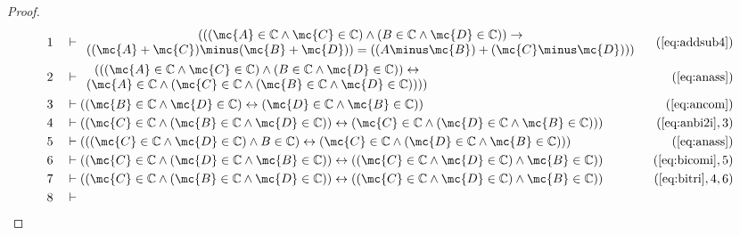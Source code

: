 \begin{proof}
\begin{align}
  1 &&  & \vdash 
     \begin{array}{c}
     ( ( ( \mc{A} \in \mathbb{C} \wedge \mc{C} \in \mathbb{C} ) \wedge ( B
     \in \mathbb{C} \wedge \mc{D} \in \mathbb{C} ) )
     \rightarrow \\
      ( ( \mc{A} + \mc{C} ) \minus ( \mc{B} + \mc{D} ) ) = ( ( A
     \minus \mc{B} ) + ( \mc{C} \minus \mc{D} ) )
     )
     \end{array}
     &(\mbox{\ref{eq:addsub4}})\notag
  \\ 2 &&  & \vdash 
     \begin{array}{c}
     ( ( ( \mc{A} \in \mathbb{C} \wedge \mc{C} \in \mathbb{C} ) \wedge ( B
     \in \mathbb{C} \wedge \mc{D} \in \mathbb{C} ) )
     \leftrightarrow \\
      ( \mc{A} \in \mathbb{C} \wedge ( \mc{C} \in
     \mathbb{C} \wedge ( \mc{B} \in \mathbb{C} \wedge \mc{D} \in
     \mathbb{C} ) ) ) )
     \end{array}
     &(\mbox{\ref{eq:anass}})\notag
  \\ 3 &&  & \vdash ( ( \mc{B} \in \mathbb{C} \wedge \mc{D} \in \mathbb{C} )
     \leftrightarrow ( \mc{D} \in \mathbb{C} \wedge \mc{B} \in
     \mathbb{C} ) )&(\mbox{\ref{eq:ancom}})\notag
  \\ 4 &&  & \vdash ( ( \mc{C} \in \mathbb{C} \wedge ( \mc{B} \in \mathbb{C} \wedge \mc{D} \in
     \mathbb{C} ) ) \leftrightarrow ( \mc{C} \in \mathbb{C}
     \wedge ( \mc{D} \in \mathbb{C} \wedge \mc{B} \in \mathbb{C} ) )
     )&(\mbox{\ref{eq:anbi2i}},3)\notag
  \\ 5 &&  & \vdash ( ( ( \mc{C} \in \mathbb{C} \wedge \mc{D} \in \mathbb{C} ) \wedge B
     \in \mathbb{C} ) \leftrightarrow ( \mc{C} \in \mathbb{C}
     \wedge ( \mc{D} \in \mathbb{C} \wedge \mc{B} \in \mathbb{C} ) )
     )&(\mbox{\ref{eq:anass}})\notag
  \\ 6 &&  & \vdash ( ( \mc{C} \in \mathbb{C} \wedge ( \mc{D} \in \mathbb{C} \wedge \mc{B} \in
     \mathbb{C} ) ) \leftrightarrow ( ( \mc{C} \in \mathbb{C}
     \wedge \mc{D} \in \mathbb{C} ) \wedge \mc{B} \in \mathbb{C} )
     )&(\mbox{\ref{eq:bicomi}},5)\notag
  \\ 7 &&  & \vdash ( ( \mc{C} \in \mathbb{C} \wedge ( \mc{B} \in \mathbb{C} \wedge \mc{D} \in
     \mathbb{C} ) ) \leftrightarrow ( ( \mc{C} \in \mathbb{C}
     \wedge \mc{D} \in \mathbb{C} ) \wedge \mc{B} \in \mathbb{C} )
     )&(\mbox{\ref{eq:bitri}},4,6)\notag
  \\ 8 &&  & \vdash 

\end{align}
\end{proof}
